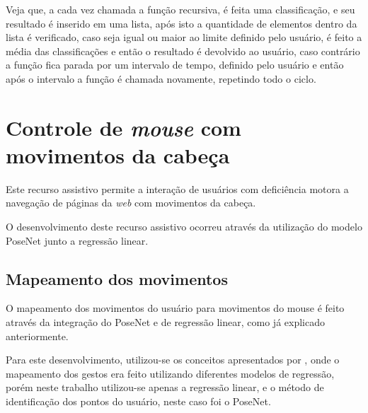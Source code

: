 \par Veja que, a cada vez chamada a função recursiva, é feita uma classificação, e seu resultado é inserido em uma lista, após isto a quantidade de elementos dentro da lista é verificado, caso seja igual ou maior ao limite definido pelo usuário, é feito a média das classificações e então o resultado é devolvido ao usuário, caso contrário a função fica parada por um intervalo de tempo, definido pelo usuário e então após o intervalo a função é chamada novamente, repetindo todo o ciclo.

\section{Controle de \textit{mouse} com movimentos da cabeça}

\par Este recurso assistivo permite a interação de usuários com deficiência motora a navegação de páginas da \textit{web} com movimentos da cabeça.

\par O desenvolvimento deste recurso assistivo ocorreu através da utilização do modelo PoseNet junto a regressão linear.


\subsection{Mapeamento dos movimentos}


\par O mapeamento dos movimentos do usuário para movimentos do mouse é feito através da integração do PoseNet e de regressão linear, como já explicado anteriormente.

\par Para este desenvolvimento, utilizou-se os conceitos apresentados por \cite{Papoutsaki2016}, onde o mapeamento dos gestos era feito utilizando diferentes modelos de regressão, porém neste trabalho utilizou-se apenas a regressão linear, e o método de identificação dos pontos do usuário, neste caso foi o PoseNet.

